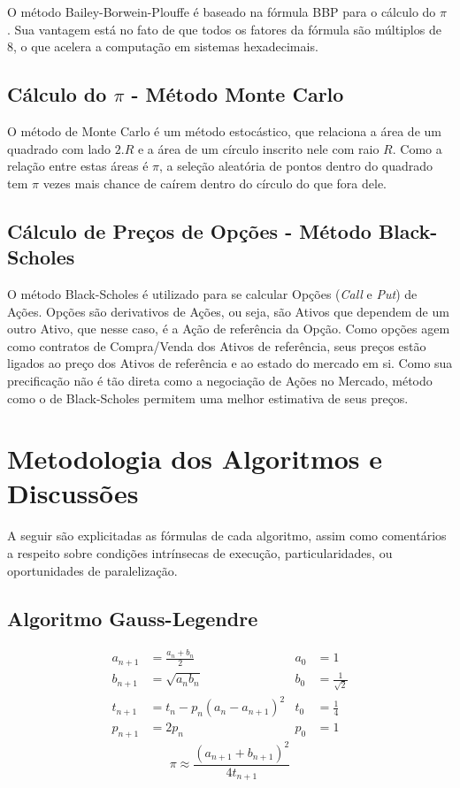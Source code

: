 \documentclass[12pt]{article}
\begin{document}
O método Bailey-Borwein-Plouffe é baseado na fórmula BBP para o cálculo do $\pi$
\cite{Bailey:97}.
Sua vantagem está no fato de que todos os fatores da fórmula são múltiplos de 8,
o que acelera a computação em sistemas hexadecimais.

\subsection{Cálculo do $\pi$ - Método Monte Carlo}

O método de Monte Carlo é um método estocástico, que relaciona a área de um quadrado com lado
$2.R$ e a área de um círculo inscrito nele com raio $R$. Como a relação entre estas áreas é
$\pi$, a seleção aleatória de pontos dentro do quadrado tem $\pi$ vezes mais chance de caírem
dentro do círculo do que fora dele.

\subsection{Cálculo de Preços de Opções - Método Black-Scholes}

O método Black-Scholes é utilizado para se calcular Opções (\textit{Call} e \textit{Put}) de
Ações. Opções são derivativos de Ações, ou seja, são Ativos que dependem de um outro Ativo,
que nesse caso, é a Ação de referência da Opção. Como opções agem como contratos de Compra/Venda
dos Ativos de referência, seus preços estão ligados ao preço dos Ativos de referência e ao
estado do mercado em si. Como sua precificação não é tão direta como a negociação de Ações no
Mercado, método como o de Black-Scholes permitem uma melhor estimativa de seus preços.

\section{Metodologia dos Algoritmos e Discussões} \label{sec:formulas}

A seguir são explicitadas as fórmulas de cada algoritmo, assim como comentários a respeito sobre
condições intrínsecas de execução, particularidades, ou oportunidades de paralelização.

\subsection{Algoritmo Gauss-Legendre}

\begin{equation}
	\begin{aligned}
		a_{n+1} &= \frac{a_n + b_n}{2}			& a_0 &= 1\\
		b_{n+1} &= \sqrt{a_n b_n}				& b_0 &= \frac{1}{\sqrt{2}} \\
		t_{n+1} &= t_n - p_n(a_{n}-a_{n+1})^2	& t_0 &= \frac{1}{4} \\
		p_{n+1} &= 2p_n							& p_0 &= 1		
	\end{aligned}
\end{equation}
\begin{equation}
	\pi \approx \frac{(a_{n+1}+b_{n+1})^2}{4t_{n+1}}
\end{equation}
\end{document}
